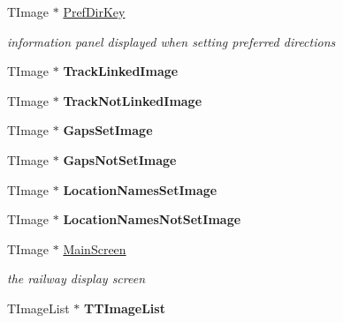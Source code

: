 \begin{DoxyCompactItemize}
\mbox{\label{class_t_interface_a0183d2bace5c2b3f7a9e3a516c3d8f4b}} 
T\+Image $\ast$ \mbox{\hyperlink{class_t_interface_a0183d2bace5c2b3f7a9e3a516c3d8f4b}{Pref\+Dir\+Key}}
\begin{DoxyCompactList}\small\item\em information panel displayed when setting preferred directions \end{DoxyCompactList}\item 
\mbox{\label{class_t_interface_acda1eb5d85f40910fcda4b4580be1f7b}} 
T\+Image $\ast$ {\bfseries Track\+Linked\+Image}
\item 
\mbox{\label{class_t_interface_a9ca92690298b34e92e2dc6ddd7626e1d}} 
T\+Image $\ast$ {\bfseries Track\+Not\+Linked\+Image}
\item 
\mbox{\label{class_t_interface_ac8fe7340879483fb2d01c256b944cfe3}} 
T\+Image $\ast$ {\bfseries Gaps\+Set\+Image}
\item 
\mbox{\label{class_t_interface_a3a2fab162e83f83720f240764dc92333}} 
T\+Image $\ast$ {\bfseries Gaps\+Not\+Set\+Image}
\item 
\mbox{\label{class_t_interface_a34a433c061f54ec17338ac77fd374426}} 
T\+Image $\ast$ {\bfseries Location\+Names\+Set\+Image}
\item 
\mbox{\label{class_t_interface_aa46ab1c5f1a9ba7f2c23a5d6df8acbfc}} 
T\+Image $\ast$ {\bfseries Location\+Names\+Not\+Set\+Image}
\item 
\mbox{\label{class_t_interface_a24ed70b178edf21a515d34df17b6aeb3}} 
T\+Image $\ast$ \mbox{\hyperlink{class_t_interface_a24ed70b178edf21a515d34df17b6aeb3}{Main\+Screen}}
\begin{DoxyCompactList}\small\item\em the railway display screen \end{DoxyCompactList}\item 
\mbox{\label{class_t_interface_a51d05d3ea1933b582548629cf16b3659}} 
T\+Image\+List $\ast$ {\bfseries T\+T\+Image\+List}
\item 

\end{DoxyCompactItemize}
